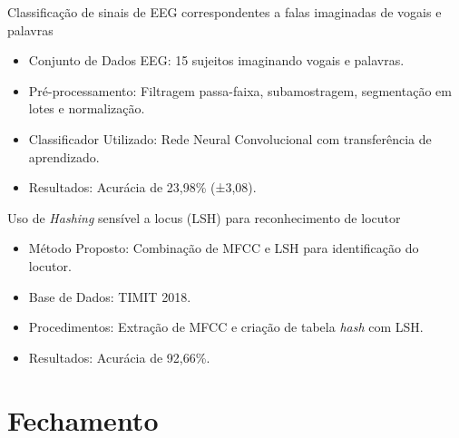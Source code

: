 \documentclass{beamer}
\begin{document}
	\begin{frame}{Classificação de sinais de EEG correspondentes a falas imaginadas de vogais e palavras \cite{tamm2020classification}}
		\begin{itemize}
			\item Conjunto de Dados EEG: 15 sujeitos imaginando vogais e palavras.
			\item Pré-processamento: Filtragem passa-faixa, subamostragem, segmentação em lotes e normalização.
			\item Classificador Utilizado: Rede Neural Convolucional com transferência de aprendizado.
			\item Resultados: Acurácia de 23,98\% (±3,08).
		\end{itemize}
		
	\end{frame}
	
	\begin{frame}{Uso de \textit{Hashing} sensível a locus (LSH) para reconhecimento de locutor \cite{8396208}}
		\begin{itemize}
			\item Método Proposto: Combinação de MFCC e LSH para identificação do locutor.
			\item Base de Dados: TIMIT 2018.
			\item Procedimentos: Extração de MFCC e criação de tabela \textit{hash} com LSH.
			\item Resultados: Acurácia de 92,66\%.
		\end{itemize}
		
	\end{frame}

	\section{Fechamento}
\end{document}
